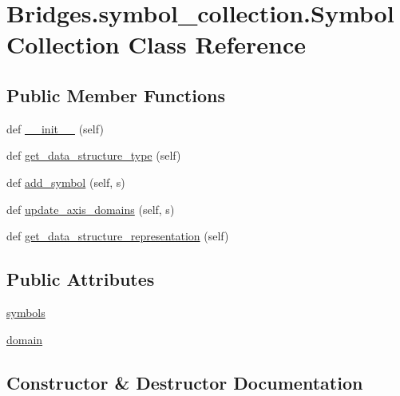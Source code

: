 \hypertarget{class_bridges_1_1symbol__collection_1_1_symbol_collection}{}\section{Bridges.\+symbol\+\_\+collection.\+Symbol\+Collection Class Reference}
\label{class_bridges_1_1symbol__collection_1_1_symbol_collection}
\subsection*{Public Member Functions}
\begin{DoxyCompactItemize}
\item 
def \mbox{\hyperlink{class_bridges_1_1symbol__collection_1_1_symbol_collection_a13e7b6cfe7ef998efd4ecad6a93a7b01}{\+\_\+\+\_\+init\+\_\+\+\_\+}} (self)
\item 
def \mbox{\hyperlink{class_bridges_1_1symbol__collection_1_1_symbol_collection_a4366067de7e25c3381e387f99ec37371}{get\+\_\+data\+\_\+structure\+\_\+type}} (self)
\item 
def \mbox{\hyperlink{class_bridges_1_1symbol__collection_1_1_symbol_collection_a583c30c2c5a631a18b483ad4b30ba74d}{add\+\_\+symbol}} (self, s)
\item 
def \mbox{\hyperlink{class_bridges_1_1symbol__collection_1_1_symbol_collection_adec8ee6f33a7c9bfb5c6c745e306bc92}{update\+\_\+axis\+\_\+domains}} (self, s)
\item 
def \mbox{\hyperlink{class_bridges_1_1symbol__collection_1_1_symbol_collection_ad68d163bf1af42da799c97b523d92a47}{get\+\_\+data\+\_\+structure\+\_\+representation}} (self)
\end{DoxyCompactItemize}
\subsection*{Public Attributes}
\begin{DoxyCompactItemize}
\item 
\mbox{\hyperlink{class_bridges_1_1symbol__collection_1_1_symbol_collection_a4d579bd5bc28eeaa30da8ef91b7cb722}{symbols}}
\item 
\mbox{\hyperlink{class_bridges_1_1symbol__collection_1_1_symbol_collection_a40513e14b3981a73c0886fb4e8afe1e1}{domain}}
\end{DoxyCompactItemize}


\subsection{Constructor \& Destructor Documentation}
\mbox{\label{class_bridges_1_1symbol__collection_1_1_symbol_collection_a13e7b6cfe7ef998efd4ecad6a93a7b01}} 
